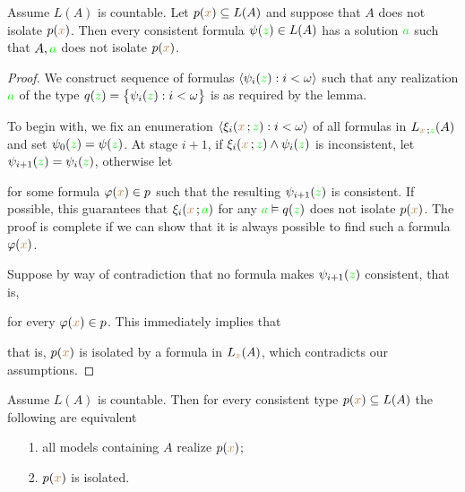 \documentclass[creche.tex]{subfiles}
\begin{document}
\begin{lemma}\label{lem_kuratowskiUlam}
Assume $L(A)$ is countable.
Let $p({\color{brown} x})\subseteq L(A)$ and suppose that $A$ does not isolate $p({\color{brown} x})$.
Then every consistent formula $\psi({\color{green} z})\in L(A)$ has a solution ${\color{green} a}$ such that $A,{\color{green} a}$ does not isolate $p({\color{brown} x})$.
\end{lemma}
\begin{proof}
We construct sequence of formulas $\langle\psi_i({\color{green} z}):i<\omega\rangle$ such that any realization ${\color{green} a}$ of the type  $q({\color{green} z})=\big\{\psi_i({\color{green} z}):i<\omega\big\}$ is as required by the lemma.

To begin with, we fix an enumeration $\langle\xi_i({\color{brown} x}\,;{\color{green} z}):i<\omega\rangle$ of all formulas in $L_{{\color{brown} x}\,;{\color{green} z}}(A)$ and set $\psi_0({\color{green} z})= \psi({\color{green} z})$.
At stage $i+1$, if $\xi_i({\color{brown} x}\,;{\color{green} z})\wedge\psi_i({\color{green} z})$ is inconsistent, let $\psi_{i+1}({\color{green} z})=\psi_i({\color{green} z})$, otherwise let

 
for some formula $\varphi({\color{brown} x})\in p$ such that the resulting $\psi_{i+1}({\color{green} z})$ is consistent.
If possible, this guarantees that $\xi_i({\color{brown} x}\,;{\color{green} a})$ for any ${\color{green} a}\vDash q({\color{green} z})$ does not isolate $p({\color{brown} x})$.
The proof is complete if we can show that it is always possible to find such a formula $\varphi({\color{brown} x})$.

Suppose by way of contradiction that no formula makes $\psi_{i+1}({\color{green} z})$ consistent, that is, 


for every $\varphi({\color{brown} x})\in p$.
This immediately implies that 


that is, $p({\color{brown} x})$ is isolated by a formula in $L_{{\color{brown} x}}(A)$, which contradicts our assumptions.
\end{proof}

\begin{theorem} Assume $L(A)$ is countable.
Then for every consistent type $p({\color{brown} x})\subseteq L(A)$ the following are equivalent
\begin{itemize}   
\item[1.] all models containing $A$ realize $p({\color{brown} x})$;
\item[2.] $p({\color{brown} x})$ is isolated.
\end{itemize}
\end{theorem}
\end{document}
